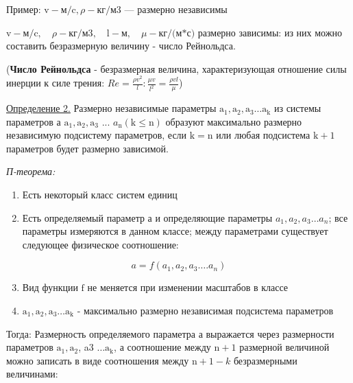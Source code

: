 Пример: $\mathrm{v}- \text{м/c}, \rho-\text{кг/м3} $ --- размерно независимы

$\mathrm{v}-\text{м/c}, \quad \rho-\text{кг/м3}, \quad\mathrm{l}-\text{м},\quad \mu-\text{кг/(м*с)}$ размерно зависимы: из них можно составить безразмерную величину - число Рейнольдса.

(\textbf{Число Рейнольдса} - безразмерная величина, характеризующая отношение силы инерции к силе трения:
$
R e=\frac{\rho v^{2}}{l}: \frac{\mu v}{l^{2}}=\frac{\rho v l}{\mu}
$)


\underline{Определение 2.} Размерно независимые параметры $\mathrm{a}_{1}, \mathrm{a}_{2}, \mathrm{a}_{3} \ldots \mathrm{a}_{\mathrm{k}}$ из системы параметров а $\mathrm{a}_{1}, \mathrm{a}_{2}, \mathrm{a}_{3}$ ... $a_{\mathrm{n}}(\mathrm{k}\leq\mathrm{n})$ образуют максимально размерно независимую подсистему параметров, если $\mathrm{k}=\mathrm{n}$ или любая подсистема $\mathrm{k}+1$ параметров будет размерно зависимой.

\textit{П-теорема:}
\begin{enumerate}
  \item Есть некоторый класс систем единиц

  \item Есть определяемый параметр а и определяющие параметры $a_{1}, a_{2}, a_{3} \ldots a_{n}$; все параметры измеряются в данном классе; между параметрами существует следующее физическое соотношение:

\end{enumerate}

$$
a=f\left(a_{1}, a_{2}, a_{3} \ldots . a_{n}\right)
$$

\begin{enumerate}
  \setcounter{enumi}{2}
  \item Вид функции $\mathrm{f}$ не меняется при изменении масштабов в классе

  \item $\mathrm{a}_{1}, \mathrm{a}_{2}, \mathrm{a}_{3} \ldots \mathrm{a}_{\mathrm{k}}$ - максимально размерно независимая подсистема параметров

\end{enumerate}

Тогда:
Размерность определяемого параметра а выражается через размерности параметров $\mathrm{a}_{1}, \mathrm{a}_{2}$, a3 $\ldots \mathrm{a}_{\mathrm{k}}$, а соотношение между $\mathrm{n}+1$ размерной величиной можно записать в виде соотношения между $\mathrm{n}+1-k$ безразмерными величинами:


